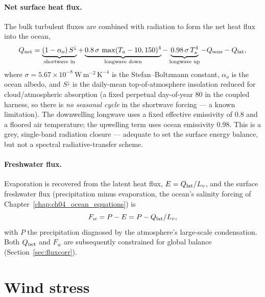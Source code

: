 \paragraph{Net surface heat flux.} The bulk turbulent fluxes are combined with
radiation to form the net heat flux into the ocean,
\begin{equation}
  Q_{\mathrm{net}} = \underbrace{(1-\alpha_o)\,S^{\downarrow}}_{\text{shortwave in}}
        + \underbrace{0.8\,\sigma\,\max(T_a-10,150)^4}_{\text{longwave down}}
        - \underbrace{0.98\,\sigma\,T_s^4}_{\text{longwave up}}
        - Q_{\mathrm{sens}} - Q_{\mathrm{lat}},
  \label{eq:qnet}
\end{equation}
where $\sigma=5.67\times10^{-8}\ \mathrm{W\,m^{-2}\,K^{-4}}$ is the
Stefan--Boltzmann constant, $\alpha_o$ is the ocean albedo, and $S^{\downarrow}$
is the daily-mean top-of-atmosphere insolation reduced for cloud/atmospheric
absorption (a fixed perpetual day-of-year $80$ in the coupled harness, so there is
\emph{no seasonal cycle} in the shortwave forcing --- a known limitation). The
downwelling longwave uses a fixed effective emissivity of $0.8$ and a floored air
temperature; the upwelling term uses ocean emissivity $0.98$. This is a grey,
single-band radiation closure --- adequate to set the surface energy balance, but
not a spectral radiative-transfer scheme.

\paragraph{Freshwater flux.} Evaporation is recovered from the latent heat flux,
$E = Q_{\mathrm{lat}}/L_v$, and the surface freshwater flux (precipitation minus
evaporation, the ocean's salinity forcing of Chapter~\ref{chap:ch04_ocean_equations}) is
\begin{equation}
  F_w = P - E = P - Q_{\mathrm{lat}}/L_v,
  \label{eq:fw}
\end{equation}
with $P$ the precipitation diagnosed by the atmosphere's large-scale
condensation. Both $Q_{\mathrm{net}}$ and $F_w$ are subsequently constrained for global
balance (Section~\ref{sec:fluxcorr}).

\section{Wind stress}

